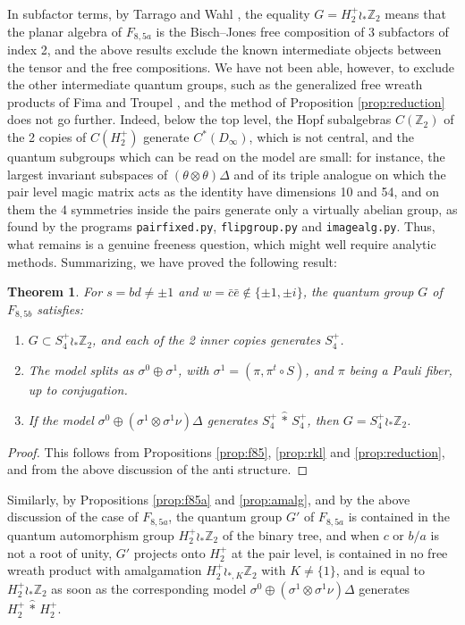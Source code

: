 \documentclass[11pt]{amsart}
\newtheorem{theorem}{Theorem}[section]
\begin{document}
\noindent In subfactor terms, by Tarrago and Wahl \cite{twa}, the equality $G=H_2^+\wr_*\mathbb Z_2$ means that the planar algebra of $F_{8,5a}$ is the Bisch--Jones free composition \cite{bjo} of 3 subfactors of index 2, and the above results exclude the known intermediate objects between the tensor and the free compositions. We have not been able, however, to exclude the other intermediate quantum groups, such as the generalized free wreath products of Fima and Troupel \cite{ftr}, and the method of Proposition \ref{prop:reduction} does not go further. Indeed, below the top level, the Hopf subalgebras $C(\mathbb Z_2)$ of the 2 copies of $C(H_2^+)$ generate $C^*(D_\infty)$, which is not central, and the quantum subgroups which can be read on the model are small: for instance, the largest invariant subspaces of $(\theta\otimes\theta)\Delta$ and of its triple analogue on which the pair level magic matrix acts as the identity have dimensions 10 and 54, and on them the 4 symmetries inside the pairs generate only a virtually abelian group, as found by the programs \texttt{pairfixed.py}, \texttt{flipgroup.py} and \texttt{imagealg.py}. Thus, what remains is a genuine freeness question, which might well require analytic methods. Summarizing, we have proved the following result:

\begin{theorem}\label{thm:f85b}
For $s=bd\neq\pm1$ and $w=\bar{c}\bar{e}\notin\{\pm1,\pm i\}$, the quantum group $G$ of $F_{8,5b}$ satisfies:
\begin{enumerate}
\item $G\subset S_4^+\wr_*\mathbb Z_2$, and each of the 2 inner copies generates $S_4^+$.

\item The model splits as $\sigma^0\oplus\sigma^1$, with $\sigma^1=(\pi,\pi^t\circ S)$, and $\pi$ being a Pauli fiber, up to conjugation.

\item If the model $\sigma^0\oplus(\sigma^1\otimes\sigma^1\nu)\Delta$ generates $S_4^+\,\hat{*}\,S_4^+$, then $G=S_4^+\wr_*\mathbb Z_2$.
\end{enumerate}
\end{theorem}

\begin{proof}
This follows from Propositions \ref{prop:f85}, \ref{prop:rkl} and \ref{prop:reduction}, and from the above discussion of the anti structure.
\end{proof}

Similarly, by Propositions \ref{prop:f85a} and \ref{prop:amalg}, and by the above discussion of the case of $F_{8,5a}$, the quantum group $G'$ of $F_{8,5a}$ is contained in the quantum automorphism group $H_2^+\wr_*\mathbb Z_2$ of the binary tree, and when $c$ or $b/a$ is not a root of unity, $G'$ projects onto $H_2^+$ at the pair level, is contained in no free wreath product with amalgamation $H_2^+\wr_{*,K}\mathbb Z_2$ with $K\neq\{1\}$, and is equal to $H_2^+\wr_*\mathbb Z_2$ as soon as the corresponding model $\sigma^0\oplus(\sigma^1\otimes\sigma^1\nu)\Delta$ generates $H_2^+\,\hat{*}\,H_2^+$.
\end{document}
